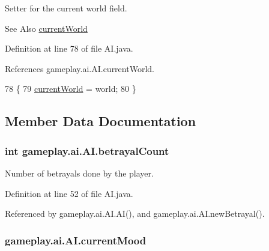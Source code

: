 Setter for the current world field. 

\begin{DoxySeeAlso}{See Also}
\hyperlink{classgameplay_1_1ai_1_1_a_i_ae4344290e04c468cdd631fc367f4f885}{current\-World} 
\end{DoxySeeAlso}


Definition at line 78 of file A\-I.\-java.



References gameplay.\-ai.\-A\-I.\-current\-World.


\begin{DoxyCode}
78                                              \{
79         \hyperlink{classgameplay_1_1ai_1_1_a_i_ae4344290e04c468cdd631fc367f4f885}{currentWorld} = world;
80     \}
\end{DoxyCode}


\subsection{Member Data Documentation}
\hypertarget{classgameplay_1_1ai_1_1_a_i_a3e328844c8791e3034bcf2fa5cc00f28}{
\subsubsection[{betrayal\-Count}]{\setlength{\rightskip}{0pt plus 5cm}int gameplay.\-ai.\-A\-I.\-betrayal\-Count\hspace{0.3cm}{\ttfamily [protected]}}}\label{classgameplay_1_1ai_1_1_a_i_a3e328844c8791e3034bcf2fa5cc00f28}


Number of betrayals done by the player. 



Definition at line 52 of file A\-I.\-java.



Referenced by gameplay.\-ai.\-A\-I.\-A\-I(), and gameplay.\-ai.\-A\-I.\-new\-Betrayal().

\hypertarget{classgameplay_1_1ai_1_1_a_i_aad698027b11d4b58a4da8c2952484ccb}{
\subsubsection[{current\-Mood}]{ gameplay.\-ai.\-A\-I.\-current\-Mood\hspace{0.3cm}{\ttfamily [protected]}}}\label{classgameplay_1_1ai_1_1_a_i_aad698027b11d4b58a4da8c2952484ccb}


